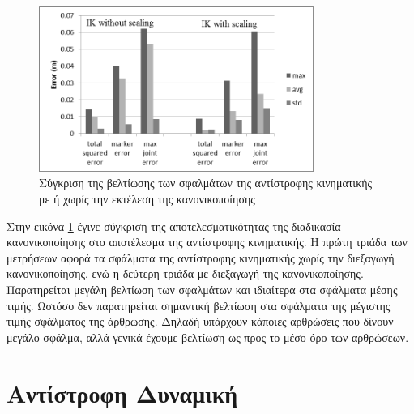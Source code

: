 \begin{figure}[H]
    \centering
    \includegraphics[width=0.8\textwidth, keepaspectratio]{fig/ik-no-scale-with-scale.png}
    \caption{Σύγκριση της βελτίωσης των σφαλμάτων της αντίστροφης κινηματικής με ή χωρίς την εκτέλεση της κανονικοποίησης}
    \label{fig:ik-no-scale-with-scale}
\end{figure}

Στην εικόνα \ref{fig:ik-no-scale-with-scale} έγινε σύγκριση της αποτελεσματικότητας της διαδικασία κανονικοποίησης στο αποτέλεσμα της αντίστροφης κινηματικής. Η πρώτη τριάδα των μετρήσεων αφορά τα σφάλματα της αντίστροφης κινηματικής χωρίς την διεξαγωγή κανονικοποίησης, ενώ η δεύτερη τριάδα με διεξαγωγή της κανονικοποίησης. Παρατηρείται μεγάλη βελτίωση των σφαλμάτων και ιδιαίτερα στα σφάλματα μέσης τιμής. Ωστόσο δεν παρατηρείται σημαντική βελτίωση στα σφάλματα της μέγιστης τιμής σφάλματος της άρθρωσης. Δηλαδή υπάρχουν κάποιες αρθρώσεις που δίνουν μεγάλο σφάλμα, αλλά γενικά έχουμε βελτίωση ως προς το μέσο όρο των αρθρώσεων.

\section{Αντίστροφη Δυναμική}

